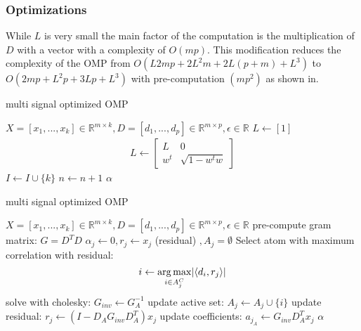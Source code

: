\subsubsection*{Optimizations}
While $L$ is very small the main factor of the computation is
the multiplication of $D$ with a vector with a complexity of $O(mp)$. 
This modification reduces the complexity of the OMP from $O\left(L2mp + 2L^2m +
2L(p+m) + L^3\right)$ to $O\left(2mp + L^2p + 3Lp + L^3\right)$ 
with pre-computation $\left(mp^2\right)$ as shown in\cite{Rubinstein2008}. 


\begin{algorithm}
\caption{multi signal optimized OMP}
\label{alg:batchOMP}
\begin{algorithmic}[1]
\REQUIRE $X =[x_1,...,x_k]  \in \mathbb{R}^{m \times k}, D  =[d_1,...,d_p]  \in
\mathbb{R}^{m\times p}, \epsilon \in \mathbb{R}$
\STATE $L\gets[1]$
\STATE
{}
\STATE
\begin{align}
L \gets \left[
\begin{array}{ccc}
L & 0\\
w^t & \sqrt{1-w^tw}
\end{array}
\right]
\end{align}
\ENDIF
\STATE $I \gets I \cup \{ k\}$
\STATE
\STATE $n \gets n+1$
\ENDWHILE
\RETURN $\alpha$
\end{algorithmic}
\end{algorithm}

\begin{algorithm}
\caption{multi signal optimized OMP}
\label{alg:batchOMP}
\begin{algorithmic}[1]
\REQUIRE $X =[x_1,...,x_k]  \in \mathbb{R}^{m \times k}, D  =[d_1,...,d_p]  \in \mathbb{R}^{m\times p}, \epsilon \in \mathbb{R}$
\STATE pre-compute gram matrix: $G=D^TD$
\STATE $\alpha_j \gets 0, r_j \gets x_j $ (residual) $, A_j=\emptyset$
\STATE Select atom with maximum correlation with residual: 
\begin{equation*}
i \gets \operatorname*{arg\,max}_{i \in A_j^C} \lvert \left<d_i,r_j\right> \rvert
\end{equation*}
\STATE solve with cholesky: $G_{inv} \gets G_A^{-1}$
\STATE update active set: $A_j \gets A_j \cup \{i\} $
\STATE update residual: $r_j \gets \left(I-D_AG_{inv}D_A^T \right)x_j$
\STATE update coefficients: $a_{j_A} \gets G_{inv} D_A^T x_j $
\ENDFOR 
\ENDFOR 
\RETURN $\alpha$
\end{algorithmic}
\end{algorithm}


